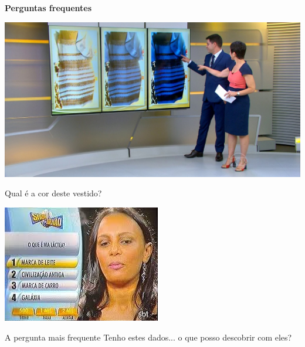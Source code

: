 \documentclass{beamer}
\begin{document}
\begin{frame}
  \begin{center}
    {\bf Perguntas frequentes}
  \end{center}
\end{frame}

\begin{frame}
  \begin{center}
    \includegraphics[width=\textwidth]{Imagens/pergunta1}

    Qual é a cor deste vestido?
  \end{center}
\end{frame}

\begin{frame}
  \begin{center}
    \includegraphics[width=.7\textwidth]{Imagens/pergunta2}
  \end{center}
\end{frame}

\begin{frame}
  \begin{block}{A pergunta mais frequente}
    Tenho estes dados... o que posso descobrir com eles?
  \end{block}
\end{frame}
\end{document}
